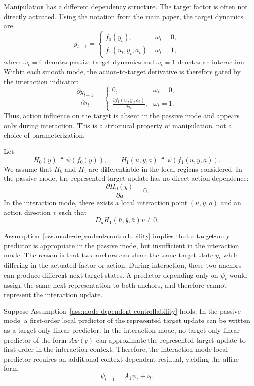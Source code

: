 Manipulation has a different dependency structure.
The target factor is often not directly actuated.
Using the notation from the main paper, the target dynamics are
\[
y_{t+1}
=
\begin{cases}
f_0(y_t), & \omega_t=0,\\
f_1(u_t,y_t,a_t), & \omega_t=1,
\end{cases}
\]
where $\omega_t=0$ denotes passive target dynamics and $\omega_t=1$ denotes an interaction.
Within each smooth mode, the action-to-target derivative is therefore gated by the interaction indicator:
\[
    \frac{\partial y_{t+1}}{\partial a_t}
    =
    \begin{cases}
    0, & \omega_t=0,\\
    \frac{\partial f_1(u_t,y_t,a_t)}{\partial a_t}, & \omega_t=1.
    \end{cases}
\]
Thus, action influence on the target is absent in the passive mode and appears only during interaction.
This is a structural property of manipulation, not a choice of parameterization.

\begin{assumption}
\label{ass:mode-dependent-controllability}
Let
\[
    H_0(y) \triangleq \psi(f_0(y)),
    \qquad
    H_1(u,y,a) \triangleq \psi(f_1(u,y,a)).
\]
We assume that $H_0$ and $H_1$ are differentiable in the local regions considered.
In the passive mode, the represented target update has no direct action dependence:
\[
    \frac{\partial H_0(y)}{\partial a}=0.
\]
In the interaction mode, there exists a local interaction point
$(\bar u,\bar y,\bar a)$ and an action direction $v$ such that
\[
    D_a H_1(\bar u,\bar y,\bar a)v \neq 0.
\]
\end{assumption}

Assumption~\ref{ass:mode-dependent-controllability} implies that a target-only predictor is appropriate in the passive mode, but insufficient in the interaction mode.
The reason is that two anchors can share the same target state $y_t$ while differing in the actuated factor or action.
During interaction, these two anchors can produce different next target states.
A predictor depending only on $\psi_t$ would assign the same next representation to both anchors, and therefore cannot represent the interaction update.

\begin{lemma}
\label{lem:need-affine-residual}
Suppose Assumption~\ref{ass:mode-dependent-controllability} holds.
In the passive mode, a first-order local predictor of the represented target update can be written as a target-only linear predictor.
In the interaction mode, no target-only linear predictor of the form $A\psi(y)$ can approximate the represented target update to first order in the interaction context.
Therefore, the interaction-mode local predictor requires an additional context-dependent residual, yielding the affine form
\[
    \psi_{t+1}
    =
    A_1\psi_t+b_t .
\]
\end{lemma}

